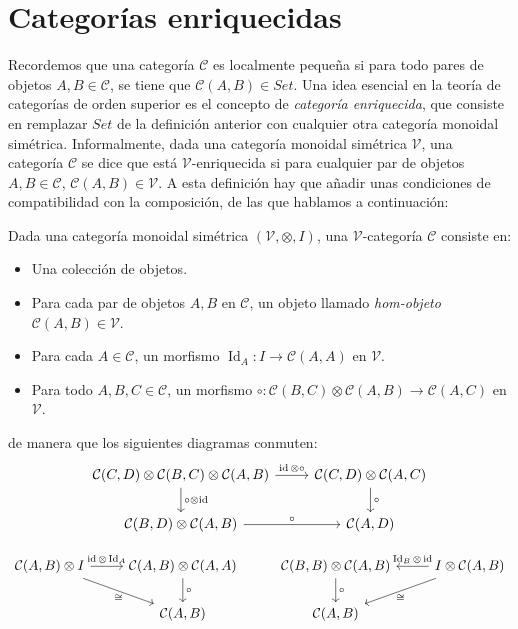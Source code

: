 \documentclass[12pt, twoside]{book}
\newcommand{\newterm}[1]{\index{#1}\emph{#1}}
\newcommand{\cat}{{\mathcal{C}}}
\newcommand{\Set}{{Set}}
\newcommand{\Cat}{{Cat}}
\DeclareMathOperator{\id}{id}
\DeclareMathOperator{\Id}{Id}
\begin{document}
\section{Categorías enriquecidas}
Recordemos que una categoría $\cat$ es localmente pequeña si para todo pares de objetos $A, B \in \cat$, se tiene que $\cat(A,B) \in \Set$.
Una idea esencial en la teoría de categorías de orden superior es el concepto de \emph{categoría enriquecida}, que consiste en remplazar $\Set$ de la definición anterior con cualquier otra categoría monoidal simétrica.
Informalmente, dada una categoría monoidal simétrica $\mathcal{V}$, una categoría $\cat$ se dice que está $\mathcal{V}$-enriquecida si para cualquier par de objetos $A, B \in \cat$, $\cat(A, B) \in \mathcal{V}$.
A esta definición hay que añadir unas condiciones de compatibilidad con la composición, de las que hablamos a continuación:

\begin{definition}
Dada una categoría monoidal simétrica $(\mathcal{V}, \otimes, I)$, una $\mathcal{V}$-categoría $\cat$ consiste en:
\begin{itemize}
  \item Una colección de objetos.
  \item Para cada par de objetos $A, B$ en $\cat$, un objeto llamado \newterm{hom-objeto} $\cat(A,B) \in \mathcal{V}$.
  \item Para cada $A \in \cat$, un morfismo $\Id_A \colon I \to \cat(A,A)$ en $\mathcal{V}$.
  \item Para todo $A, B, C \in \cat$, un morfismo $\circ \colon \cat(B,C) \otimes \cat(A,B) \to \cat(A,C)$ en $\mathcal{V}$.
\end{itemize}
de manera que los siguientes diagramas conmuten:
\[ \begin{tikzcd}
{\cat(C,D) \otimes \cat(B,C) \otimes \cat(A,B)} \arrow[r,"\id\otimes\circ"] \arrow[d,"\circ\otimes\id"]& {\cat(C,D) \otimes \cat(A,C)} \arrow[d,"\circ"]\\
{\cat(B,D) \otimes \cat(A,B)} \arrow[r,"\circ"] & {\cat(A,D)}
\end{tikzcd}\]

\[ \begin{tikzcd}
{\cat(A,B) \otimes I} \arrow[r,"\id\otimes\Id_A"] \arrow[dr,"\cong" below] & {\cat(A,B) \otimes \cat(A,A)} \arrow[d,"\circ"] & {\cat(B,B) \otimes \cat(A,B)} \arrow[d,"\circ"] & {I \otimes \cat(A,B)} \arrow[l,"\Id_B \otimes \id" above] \arrow[dl,"\cong" below]\\
& \cat(A,B) & \cat(A,B)
\end{tikzcd}\]
\end{definition}
\end{document}

